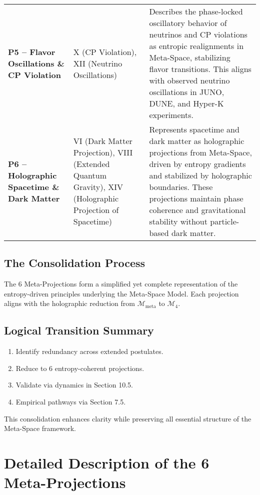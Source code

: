 \documentclass[10.5pt,a4paper]{article}
\begin{document}
{\begin{tabularx}{\textwidth}{>{\bfseries}p{4cm} p{5cm} X}
P5 – Flavor Oscillations \& CP Violation &
X (CP Violation), XII (Neutrino Oscillations) &
Describes the phase-locked oscillatory behavior of neutrinos and CP violations as entropic realignments 
in Meta-Space, stabilizing flavor transitions. This aligns with observed neutrino oscillations in 
JUNO, DUNE, and Hyper-K experiments. \\

P6 – Holographic Spacetime \& Dark Matter &
VI (Dark Matter Projection), VIII (Extended Quantum Gravity), XIV (Holographic Projection of Spacetime) &
Represents spacetime and dark matter as holographic projections from Meta-Space, driven by entropy 
gradients and stabilized by holographic boundaries. These projections maintain phase coherence 
and gravitational stability without particle-based dark matter. \\

\bottomrule
\end{tabularx}
}
\subsection{The Consolidation Process}

The 6 Meta-Projections form a simplified yet complete representation of the entropy-driven principles underlying the Meta-Space Model. Each projection aligns with the holographic reduction from \( \mathcal{M}_{\text{meta}} \) to \( \mathcal{M}_4 \).

\subsection{Logical Transition Summary}

\begin{enumerate}
    \item Identify redundancy across extended postulates.
    \item Reduce to 6 entropy-coherent projections.
    \item Validate via dynamics in Section 10.5.
    \item Empirical pathways via Section 7.5.
\end{enumerate}

This consolidation enhances clarity while preserving all essential structure of the Meta-Space framework.

\clearpage

\section{Detailed Description of the 6 Meta-Projections}
\end{document}
